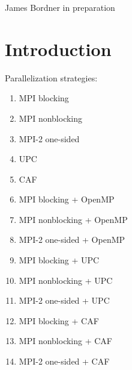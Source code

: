 \documentclass[10pt]{article}
\begin{document}
      {James Bordner}
      {in preparation}

\tableofcontents
\section{Introduction}

Parallelization strategies:

\begin{enumerate}
\item MPI blocking
\item MPI nonblocking
\item MPI-2 one-sided
\item UPC
\item CAF \\
\item MPI blocking    + OpenMP
\item MPI nonblocking + OpenMP
\item MPI-2 one-sided + OpenMP \\
\item MPI blocking    + UPC
\item MPI nonblocking + UPC
\item MPI-2 one-sided + UPC \\
\item MPI blocking    + CAF
\item MPI nonblocking + CAF
\item MPI-2 one-sided + CAF
\end{enumerate}

\EndDOCUMENT
\end{document}
